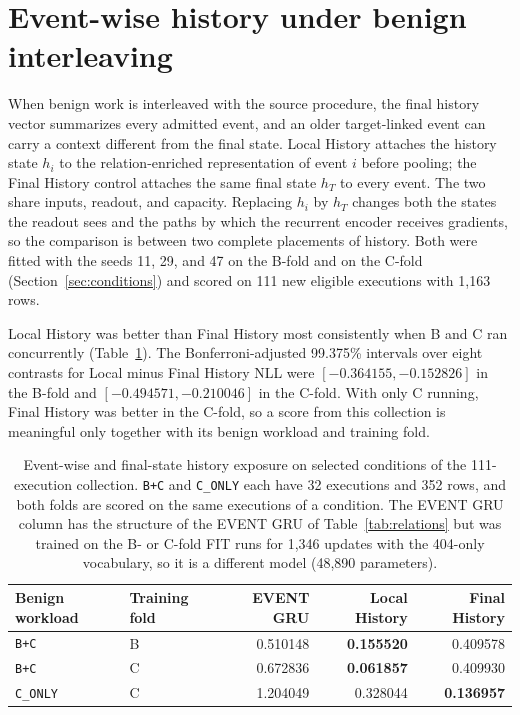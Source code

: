 \section{Event-wise history under benign interleaving}
\label{sec:app-local}

When benign work is interleaved with the source procedure, the final
history vector summarizes every admitted event, and an older
target-linked event can carry a context different from the final state.
Local History attaches the history state $h_i$ to the relation-enriched
representation of event $i$ before pooling; the Final History control
attaches the same final state $h_T$ to every event. The two share inputs,
readout, and capacity. Replacing $h_i$ by $h_T$ changes both the states
the readout sees and the paths by which the recurrent encoder receives
gradients, so the comparison is between two complete placements of
history. Both were fitted with the seeds 11, 29, and 47 on the B-fold
and on the C-fold (Section~\ref{sec:conditions}) and scored on 111 new
eligible executions with 1,163 rows.

Local History was better than Final History most consistently when B
and C ran concurrently (Table~\ref{tab:local}). The Bonferroni-adjusted
99.375\% intervals over eight contrasts for Local minus Final History
NLL were $[-0.364155,-0.152826]$ in the B-fold and
$[-0.494571,-0.210046]$ in the C-fold. With only C running, Final
History was better in the C-fold, so a score from this collection is
meaningful only together with its benign workload and training fold.

\begin{table}[htbp]
\centering
\caption[Event-wise and final-state history exposure]{Event-wise and final-state history exposure on selected
conditions of the 111-execution collection. \texttt{B+C} and
\texttt{C\_ONLY} each have 32 executions and 352 rows, and both folds are
scored on the same executions of a condition. The EVENT GRU column has
the structure of the EVENT GRU of Table~\ref{tab:relations} but was
trained on the B- or C-fold FIT runs for 1,346 updates with the 404-only
vocabulary, so it is a different model (48,890 parameters).}
\label{tab:local}
\begin{tabular}{@{}llrrr@{}}
\toprule
Benign workload & Training fold & EVENT GRU & Local History & Final History \\
\midrule
\texttt{B+C} & B & 0.510148 & \textbf{0.155520} & 0.409578 \\
\texttt{B+C} & C & 0.672836 & \textbf{0.061857} & 0.409930 \\
\texttt{C\_ONLY} & C & 1.204049 & 0.328044 & \textbf{0.136957} \\
\bottomrule
\end{tabular}
\end{table}

